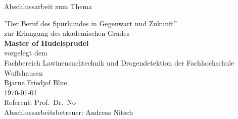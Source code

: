 
\hypersetup{pageanchor=false}%
\begin{titlepage}
\vspace{4em}
\center%
\Large{\textsf{Abschlussarbeit zum Thema}}
\vspace{1em}

\Huge{\textsf{''Der Beruf des Spürhundes in Gegenwart und Zukunft''}}
\vspace{2em}
\\
\Large{
	\textsf{
		zur Erlangung des akademischen Grades\\
		\textbf{Master of Hudelsprudel}
		\vspace{2em}
		\\
		vorgelegt dem\\
		Fachbereich Lawinensuchtechnik und Drogendetektion der Fachhochschule Wuffshausen
		}
	}
\vspace{2em}
\\
\Large{
	\textsf{
		Bjarne Friedjof Blue\\
		\today
		\vspace{2em}
		\\
		Referent: Prof.~Dr.~No\\
		Abschlussarbeitsbetreuer: Andreas Nitsch
	}
}

\end{titlepage}
\hypersetup{pageanchor=true}
